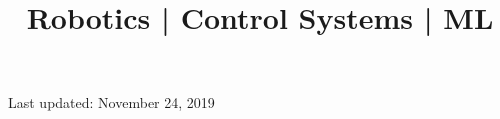 \documentclass[10pt,a4paper]{moderncv}
\title{Robotics | Control Systems  | ML
	\newline
	\bf{\lb{\footnotesize
			Rerum Cognoscere Causas: To know the causes of things.} }}
\begin{document}
	\makecvtitle
	
	
	
	
	
	
	
	
	

	\footnotesize \centering Last updated: November 24, 2019
\clearpage
\end{document}
